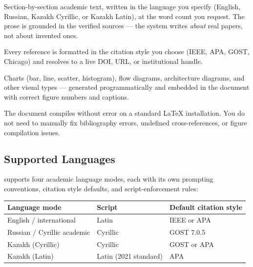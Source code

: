 \begin{description}[leftmargin=2em, style=nextline]
  \item[Structured prose.]
    Section-by-section academic text, written in the language you specify (English,
    Russian, Kazakh Cyrillic, or Kazakh Latin), at the word count you request.
    The prose is grounded in the verified sources — the system writes \emph{about}
    real papers, not about invented ones.
  \item[A verified bibliography.]
    Every reference is formatted in the citation style you choose (IEEE, APA, GOST,
    Chicago) and resolves to a live DOI, URL, or institutional handle.
  \item[Professional figures.]
    Charts (bar, line, scatter, histogram), flow diagrams, architecture diagrams,
    and other visual types — generated programmatically and embedded in the document
    with correct figure numbers and captions.
  \item[Clean compilation.]
    The document compiles without error on a standard \LaTeX{} installation.
    You do not need to manually fix bibliography errors, undefined cross-references,
    or figure compilation issues.
\end{description}

\subsection{Supported Languages}

\sys{} supports four academic language modes, each with its own prompting conventions,
citation style defaults, and script-enforcement rules:

\begin{center}
\begin{tabular}{lll}
\toprule
Language mode & Script & Default citation style \\
\midrule
English / international & Latin & IEEE or APA \\
Russian / Cyrillic academic & Cyrillic & GOST 7.0.5 \\
Kazakh (Cyrillic) & Cyrillic & GOST or APA \\
Kazakh (Latin) & Latin (2021 standard) & APA \\
\bottomrule
\end{tabular}
\end{center}


